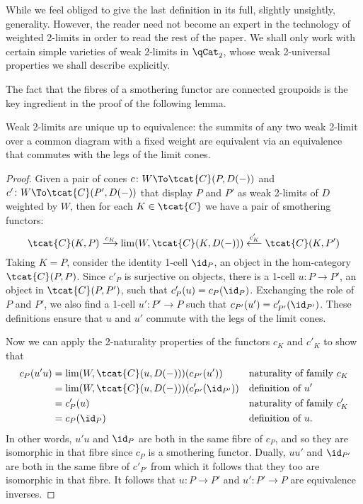   While we feel obliged to give the last definition in its full, slightly unsightly, generality. However, the reader need not become an expert in the technology of weighted 2-limits in order to read the rest of the paper. We shall only work with certain simple varieties of weak 2-limits in $\qCat_2$, whose weak 2-universal properties we shall describe explicitly.

The fact that the fibres of a smothering functor are connected groupoids is the key ingredient in the proof of the following lemma.

\begin{lem}\label{lem:unique-weak-2-limits} Weak 2-limits are unique up to equivalence: the summits of any two weak 2-limit over a common diagram with a fixed weight are equivalent via an equivalence that commutes with the legs of the limit cones.
\end{lem}

\begin{proof}
Given a pair of cones $c\colon W\To \tcat{C}(P,D(-))$ and $c'\colon W\To \tcat{C}(P',D(-))$ that display  $P$ and $P'$ as weak 2-limits of $D$ weighted by $W$, then for each $K \in \tcat{C}$ we have a pair of smothering functors:
  \begin{equation*}
    \tcat{C}(K,P)\stackrel{c_K}\longrightarrow
    \lim(W, \tcat{C}(K,D(-)))
    \stackrel{c'_{K}}\longleftarrow\tcat{C}(K,P')
  \end{equation*}
  Taking $K=P$, consider the identity 1-cell $\id_P$, an object in the hom-category $\tcat{C}(P,P)$. Since $c'_P$ is surjective on objects, there is a 1-cell $u\colon P\to P'$, an object in $\tcat{C}(P,P')$, such that $c'_{P}(u) = c_{P}(\id_P)$. Exchanging the role of $P$ and $P'$, we also find a 1-cell $u'\colon P'\to P$ such that $c_{P'}(u')=c'_{P'}(\id_{P'})$. These definitions ensure that $u$ and $u'$ commute with the legs of the limit cones.

  Now we can apply the 2-naturality properties of the functors $c_K$ and $c'_K$ to show that
  \begin{align*}
    c_{P}(u'u) &= \lim(W, \tcat{C}(u,D(-)))(c_{P'}(u')) && \text{naturality of family $c_K$}\\
    &= \lim(W, \tcat{C}(u,D(-)))(c'_{P'}(\id_{P'})) && \text{definition of $u'$}\\
    &= c'_{P}(u) && \text{naturality of family $c'_K$}\\
    & = c_{P}(\id_P) && \text{definition of $u$.}
  \end{align*} 
  In other words, $u'u$ and $\id_P$ are both in the same fibre of $c_P$, and so they are isomorphic in that fibre since $c_P$ is a smothering functor. Dually, $uu'$ and $\id_{P'}$ are both in the same fibre of $c'_{P'}$ from which it follows that they too are isomorphic in that fibre. It follows that $u\colon P\to P'$ and $u'\colon P'\to P$ are equivalence inverses. 
\end{proof}

